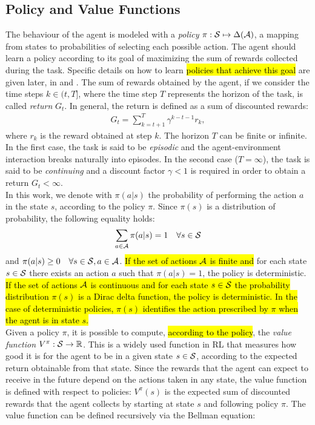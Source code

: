 \subsection{Policy and Value Functions}
The behaviour of the agent is modeled with a \emph{policy} $\pi: \mathcal{S} \mapsto \Delta(\mathcal{A})$, \ie a mapping from states to probabilities of selecting each possible action. The agent should learn a policy according to its goal of maximizing the sum of rewards collected during the task. Specific details on how to learn \hl{policies that achieve this goal} are given later, in  and . The sum of rewards obtained by the agent, if we consider the time steps $k \in (t, T]$, where the time step $T$ represents the horizon of the task, is called \emph{return} $G_t$. In general, the return is defined as a sum of discounted rewards:
\begin{align}G_t = \sum_{k=t+1}^{T} \gamma^{k-t-1} r_k, \end{align} where $r_k$ is the reward obtained at step $k$. The horizon $T$ can be finite or infinite. In the first case, the task is said to be \emph{episodic} and the agent-environment interaction breaks naturally into episodes. In the second case (\ie $T = \infty$), the task is said to be \emph{continuing} and a discount factor $\gamma<1$ is required in order to obtain a return $G_t < \infty$.\\
\newline
In this work, we denote with $\pi(a|s)$ the probability of performing the action $a$ in the state $s$, according to the policy $\pi$. Since $\pi(s)$ is a distribution of probability, the following equality holds:
\begin{align} \sum_{a \in \mathcal{A}} \pi(a|s) = 1 \quad \forall s \in \mathcal{S} \end{align}
and $\pi(a|s) \geq 0 \quad \forall s \in \mathcal{S}, a \in \mathcal{A}$.
\hl{If the set of actions $\mathcal{A}$ is finite and} for each state $s \in \mathcal{S}$ there exists an action $a$ such that $\pi(a|s) = 1$, the policy is deterministic. \hl{If the set of actions $\mathcal{A}$ is continuous and for each state $s \in \mathcal{S}$ the probability distribution $\pi(s)$ is a Dirac delta function, the policy is deterministic. In the case of deterministic policies, $\pi(s)$ identifies the action prescribed by $\pi$ when the agent is in state $s$.}\\
\newline
Given a policy $\pi$, it is possible to compute, \hl{according to the policy}, the \emph{value function} $V^{\pi}: \mathcal{S} \rightarrow \mathbb{R}$. This is a widely used function in \ac{RL} that measures how good it is for the agent to be in a given state $s \in \mathcal{S}$, according to the expected return obtainable from that state. Since the rewards that the agent can expect to receive in the future depend on the actions taken in any state, the value function is defined with respect to policies: $V^{\pi}(s)$ is the expected sum of discounted rewards that the agent collects by starting at state $s$ and following policy $\pi$. The value function can be defined recursively via the Bellman equation: 

